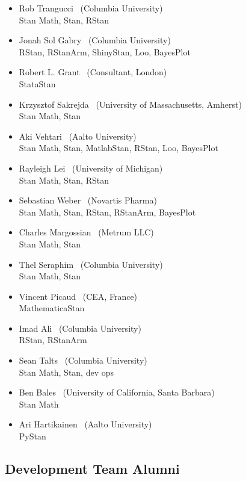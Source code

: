 \begin{itemize}
\\ {\footnotesize MatlabStan}
\item Rob Trangucci \   (Columbia University)
\\ {\footnotesize Stan Math, Stan, RStan}
\item Jonah Sol Gabry \ (Columbia University)
\\ {\footnotesize RStan, RStanArm, ShinyStan, Loo, BayesPlot}
\item Robert L. Grant \ (Consultant, London)
\\ {\footnotesize StataStan}
\item Krzysztof Sakrejda \ (University of Massachusetts, Amherst)
\\ {\footnotesize Stan Math, Stan}
\item Aki Vehtari \ (Aalto University) \\ {\footnotesize Stan Math,
    Stan, MatlabStan, RStan, Loo, BayesPlot}
\item Rayleigh Lei \ (University of Michigan)
\\ {\footnotesize Stan Math, Stan, RStan}
\item Sebastian Weber \ (Novartis Pharma)
\\ {\footnotesize Stan Math, Stan, RStan, RStanArm, BayesPlot}
\item Charles Margossian \ (Metrum LLC)
\\ {\footnotesize Stan Math, Stan}
\item Thel Seraphim \ (Columbia University)
\\ {\footnotesize Stan Math, Stan}
\item Vincent Picaud \ (CEA, France)
\\ {\footnotesize MathematicaStan}
\item Imad Ali \ (Columbia University)
\\ {\footnotesize RStan, RStanArm}
\item Sean Talts \ (Columbia University)
\\ {\footnotesize Stan Math, Stan, dev ops}
\item Ben Bales \ (University of California, Santa Barbara)
\\ {\footnotesize Stan Math}
\item Ari Hartikainen \ (Aalto University)
\\ {\footnotesize PyStan}

\end{itemize}

\subsection*{Development Team Alumni}

